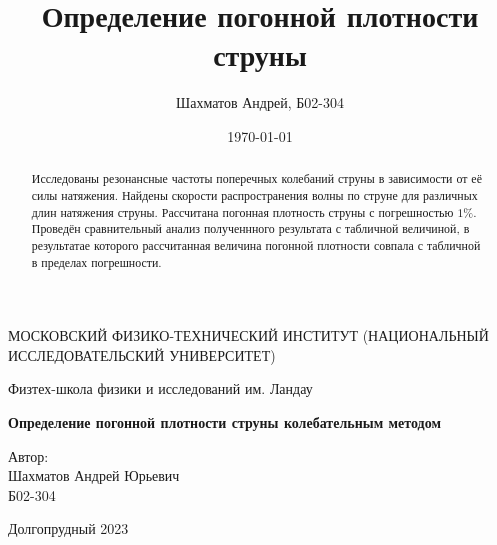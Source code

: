 \documentclass[12pt]{article}
\title{Определение погонной плотности струны}
\author{Шахматов Андрей, Б02-304}
\date{\today}
\begin{document}
\begin{titlepage}
    \begin{center}
        {\large МОСКОВСКИЙ ФИЗИКО-ТЕХНИЧЕСКИЙ ИНСТИТУТ (НАЦИОНАЛЬНЫЙ ИССЛЕДОВАТЕЛЬСКИЙ УНИВЕРСИТЕТ)}
    \end{center}
    \begin{center}
        {\large Физтех-школа физики и исследований им. Ландау}
    \end{center}
    
    
    \vspace{3cm}
    {\huge
        \begin{center}
            \textbf{Определение погонной плотности струны колебательным методом}
        \end{center}
    }
    \vspace{2cm}
    \begin{flushright}
        {\LARGE Автор:\\ Шахматов Андрей Юрьевич \\
            \vspace{0.2cm}
            Б02-304}
    \end{flushright}
    \vspace{7 cm}
    \begin{center}
        Долгопрудный 2023
    \end{center}
\end{titlepage}


\begin{abstract}
Исследованы резонансные частоты поперечных колебаний струны в зависимости от её силы натяжения. Найдены скорости распространения волны по струне
для различных длин натяжения струны. Рассчитана погонная плотность струны с погрешностью $1\%$. Проведён сравнительный анализ полученнного результата с табличной величиной,
в результатае которого рассчитанная величина погонной плотности совпала с табличной в пределах погрешности.
\end{abstract}

\tableofcontents
\end{document}
